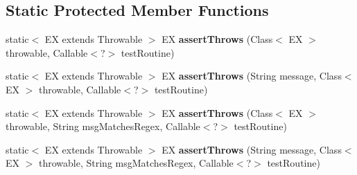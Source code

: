 \subsection*{Static Protected Member Functions}
\begin{DoxyCompactItemize}
\item 
\mbox{\label{classtestsuite_1_1x_1_1internal_1_1_internal_x_base_test_case_ac3a1995fd2d670880710f357043eb029}} 
static$<$ EX extends Throwable $>$ EX {\bfseries assert\+Throws} (Class$<$ EX $>$ throwable, Callable$<$?$>$ test\+Routine)
\item 
\mbox{\label{classtestsuite_1_1x_1_1internal_1_1_internal_x_base_test_case_a1e633fc154c97fa3b372584d828b5407}} 
static$<$ EX extends Throwable $>$ EX {\bfseries assert\+Throws} (String message, Class$<$ EX $>$ throwable, Callable$<$?$>$ test\+Routine)
\item 
\mbox{\label{classtestsuite_1_1x_1_1internal_1_1_internal_x_base_test_case_a20fe926d068016aa562d4f828e524c99}} 
static$<$ EX extends Throwable $>$ EX {\bfseries assert\+Throws} (Class$<$ EX $>$ throwable, String msg\+Matches\+Regex, Callable$<$?$>$ test\+Routine)
\item 
\mbox{\label{classtestsuite_1_1x_1_1internal_1_1_internal_x_base_test_case_a3dae21bcf159f4c3e0e5c655bb4f2de8}} 
static$<$ EX extends Throwable $>$ EX {\bfseries assert\+Throws} (String message, Class$<$ EX $>$ throwable, String msg\+Matches\+Regex, Callable$<$?$>$ test\+Routine)
\end{DoxyCompactItemize}
